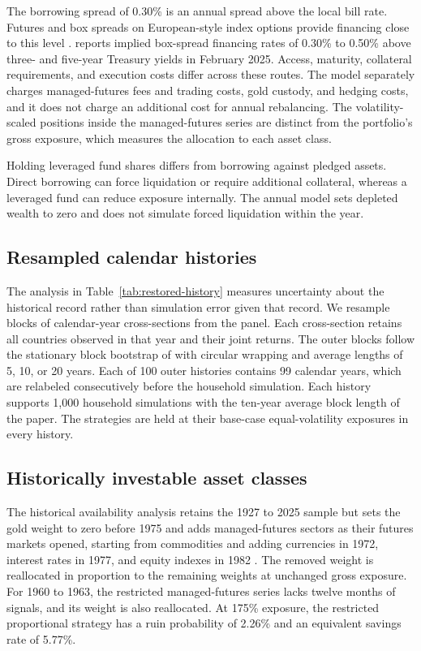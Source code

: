 The borrowing spread of 0.30\% is an annual spread above the local bill rate. Futures and box spreads on
European-style index options provide financing close to this level \citep{CMEBoxFinancing2024}.
\citet{WangBoxFinancing2025} reports implied box-spread financing rates of 0.30\% to 0.50\% above three- and
five-year Treasury yields in February 2025. Access, maturity, collateral requirements, and execution costs
differ across these routes. The model separately charges managed-futures fees and trading costs, gold
custody, and hedging costs, and it does not charge an additional cost for annual rebalancing. The
volatility-scaled positions inside the managed-futures series are distinct from the portfolio's gross
exposure, which measures the allocation to each asset class.

Holding leveraged fund shares differs from borrowing against pledged assets. Direct borrowing can force
liquidation or require additional collateral, whereas a leveraged fund can reduce exposure internally. The
annual model sets depleted wealth to zero and does not simulate forced liquidation within the year.

\subsection{Resampled calendar histories}
\label{app:historical-uncertainty}\label{app:history}

The analysis in Table~\ref{tab:restored-history} measures uncertainty about the historical record rather
than simulation error given that record. We resample blocks of calendar-year cross-sections from the
panel. Each cross-section retains all countries observed in that year and their joint returns. The outer
blocks follow the stationary block bootstrap of \citet{PolitisRomano1994} with circular wrapping and average
lengths of 5, 10, or 20 years. Each of 100 outer histories contains 99 calendar years, which are relabeled
consecutively before the household simulation. Each history supports 1,000 household simulations with the
ten-year average block length of the paper. The strategies are held at their base-case equal-volatility
exposures in every history.

\subsection{Historically investable asset classes}
\label{app:availability}

The historical availability analysis retains the 1927 to 2025 sample but sets the gold weight to zero
before 1975 and adds managed-futures sectors as their futures markets opened, starting from commodities
and adding currencies in 1972, interest rates in 1977, and equity indexes in 1982
\citep{CMEContractDates2026,USMintGold1974}. The removed weight is reallocated in proportion to the
remaining weights at unchanged gross exposure. For 1960 to 1963, the restricted managed-futures series
lacks twelve months of signals, and its weight is also reallocated. At 175\% exposure, the restricted
proportional strategy has a ruin probability of 2.26\% and an equivalent savings rate of 5.77\%.

